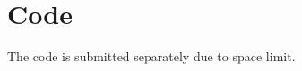 
\appendix
\chapter{Code}
\label{appendixlabel1}
The code is submitted separately due to space limit.




